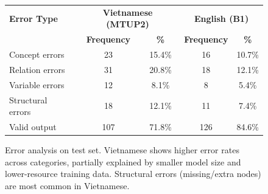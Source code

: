 

\begin{figure}[h]
\centering
\begin{tabular}{l|cc|cc}
\toprule
\textbf{Error Type} & \multicolumn{2}{c|}{\textbf{Vietnamese (MTUP2)}} & \multicolumn{2}{c}{\textbf{English (B1)}} \\
& \textbf{Frequency} & \textbf{\%} & \textbf{Frequency} & \textbf{\%} \\
\midrule
Concept errors & 23 & 15.4\% & 16 & 10.7\% \\
Relation errors & 31 & 20.8\% & 18 & 12.1\% \\
Variable errors & 12 & 8.1\% & 8 & 5.4\% \\
Structural errors & 18 & 12.1\% & 11 & 7.4\% \\
Valid output & 107 & 71.8\% & 126 & 84.6\% \\
\bottomrule
\end{tabular}
\caption{Error analysis on test set. Vietnamese shows higher error rates across categories, partially explained by smaller model size and lower-resource training data. Structural errors (missing/extra nodes) are most common in Vietnamese.}
\label{tab:error_analysis}
\end{figure}



%
%
%    
%
%
